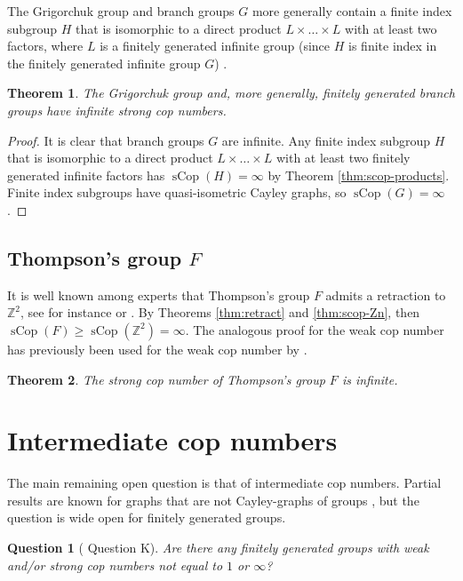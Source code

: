 \documentclass{amsart}
\newtheorem{theorem}{Theorem}[section]
\newtheorem{customquestionA}{Question}
\theoremstyle{definition}
\theoremstyle{remark}
\theoremstyle{remark}
\theoremstyle{definition}
\newcommand{\sCop}{\operatorname{sCop}}
\renewcommand{\geq}{\geqslant}
\begin{document}
The Grigorchuk group and branch groups $G$ more generally contain a finite index subgroup $H$ that is isomorphic to a direct product $L\times \ldots \times L$ with at least two factors, where $L$ is a finitely generated infinite group (since $H$ is finite index in the finitely generated infinite group $G$) \cite[Definition 1.1]{BGZ03}.

\begin{theorem}\label{thm:scop-Grigorchuk}
    The Grigorchuk group and, more generally, finitely generated branch groups have infinite strong cop numbers.
\end{theorem}
\begin{proof}
    It is clear that branch groups $G$ are infinite. Any finite index subgroup $H$ that is isomorphic to a direct product $L\times  \ldots \times L$ with at least two finitely generated infinite factors has $\sCop(H) = \infty$ by Theorem \ref{thm:scop-products}. Finite index subgroups have quasi-isometric Cayley graphs, so $\sCop(G)=\infty$.
\end{proof}


\subsection{Thompson's group $F$}\label{sec:thompsonF}

It is well known among experts that Thompson's group $F$ admits a retraction to $\mathbb{Z}^2$, see for instance \cite[Cor. 3.10]{BFZ24arxiv} or \cite[Section 4]{CoMa24arxiv}. By Theorems \ref{thm:retract} and \ref{thm:scop-Zn}, then $\sCop(F) \geq \sCop(\mathbb{Z}^2) = \infty $. The analogous proof for the weak cop number has previously been used for the weak cop number by \cite{CoMa24arxiv}.

\begin{theorem}\label{thm:scopF=infty}
    The strong cop number of Thompson's group $F$ is infinite.
\end{theorem}

\section{Intermediate cop numbers}\label{sec:intermediate}

The main remaining open question is that of intermediate cop numbers. Partial results are known for graphs that are not Cayley-graphs of groups \cite[Corollary O]{LMR23}, but the question is wide open for finitely generated groups.

\begin{customquestionA}[\cite{LMR23} Question K]\label{q:intermediate}
Are there any finitely generated groups with weak and/or strong cop numbers not equal to $1$ or $\infty$?
\end{customquestionA}
\end{document}
